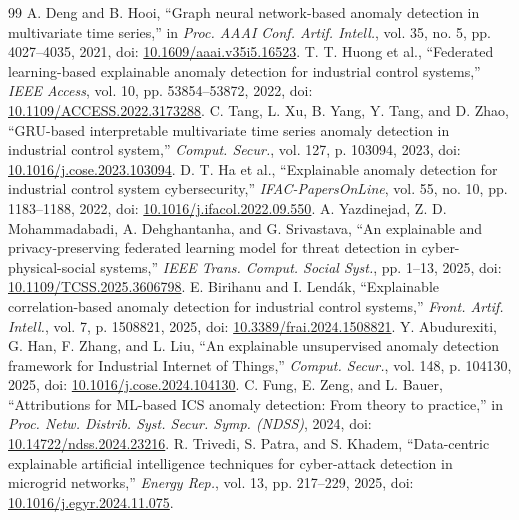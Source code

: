 \documentclass[10pt,a4paper]{article}
\begin{document}
\footnotesize
\begin{thebibliography}{99}\setlength{\itemsep}{1.5pt}\setlength{\parskip}{0pt}
 A. Deng and B. Hooi, ``Graph neural network-based anomaly detection in multivariate time series,'' in \emph{Proc. AAAI Conf. Artif. Intell.}, vol. 35, no. 5, pp. 4027--4035, 2021, doi: \href{https://doi.org/10.1609/aaai.v35i5.16523}{10.1609/aaai.v35i5.16523}.
 T. T. Huong et al., ``Federated learning-based explainable anomaly detection for industrial control systems,'' \emph{IEEE Access}, vol. 10, pp. 53854--53872, 2022, doi: \href{https://doi.org/10.1109/ACCESS.2022.3173288}{10.1109/ACCESS.2022.3173288}.
 C. Tang, L. Xu, B. Yang, Y. Tang, and D. Zhao, ``GRU-based interpretable multivariate time series anomaly detection in industrial control system,'' \emph{Comput. Secur.}, vol. 127, p. 103094, 2023, doi: \href{https://doi.org/10.1016/j.cose.2023.103094}{10.1016/j.cose.2023.103094}.
 D. T. Ha et al., ``Explainable anomaly detection for industrial control system cybersecurity,'' \emph{IFAC-PapersOnLine}, vol. 55, no. 10, pp. 1183--1188, 2022, doi: \href{https://doi.org/10.1016/j.ifacol.2022.09.550}{10.1016/j.ifacol.2022.09.550}.
 A. Yazdinejad, Z. D. Mohammadabadi, A. Dehghantanha, and G. Srivastava, ``An explainable and privacy-preserving federated learning model for threat detection in cyber-physical-social systems,'' \emph{IEEE Trans. Comput. Social Syst.}, pp. 1--13, 2025, doi: \href{https://doi.org/10.1109/TCSS.2025.3606798}{10.1109/TCSS.2025.3606798}.
 E. Birihanu and I. Lend\'ak, ``Explainable correlation-based anomaly detection for industrial control systems,'' \emph{Front. Artif. Intell.}, vol. 7, p. 1508821, 2025, doi: \href{https://doi.org/10.3389/frai.2024.1508821}{10.3389/frai.2024.1508821}.
 Y. Abudurexiti, G. Han, F. Zhang, and L. Liu, ``An explainable unsupervised anomaly detection framework for Industrial Internet of Things,'' \emph{Comput. Secur.}, vol. 148, p. 104130, 2025, doi: \href{https://doi.org/10.1016/j.cose.2024.104130}{10.1016/j.cose.2024.104130}.
 C. Fung, E. Zeng, and L. Bauer, ``Attributions for ML-based ICS anomaly detection: From theory to practice,'' in \emph{Proc. Netw. Distrib. Syst. Secur. Symp. (NDSS)}, 2024, doi: \href{https://doi.org/10.14722/ndss.2024.23216}{10.14722/ndss.2024.23216}.
 R. Trivedi, S. Patra, and S. Khadem, ``Data-centric explainable artificial intelligence techniques for cyber-attack detection in microgrid networks,'' \emph{Energy Rep.}, vol. 13, pp. 217--229, 2025, doi: \href{https://doi.org/10.1016/j.egyr.2024.11.075}{10.1016/j.egyr.2024.11.075}.

\end{thebibliography}
\end{document}
